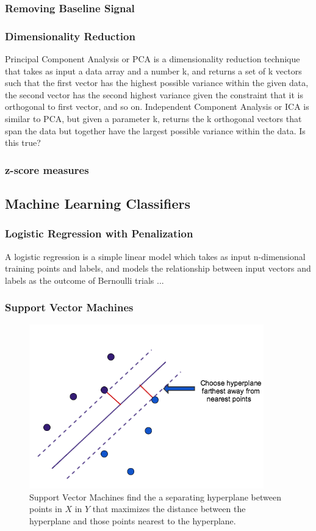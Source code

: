 \documentclass[11pt]{report}
\begin{document}
\subsubsection{Removing Baseline Signal}
\subsubsection{Dimensionality Reduction}
Principal Component Analysis or PCA is a dimensionality reduction technique that takes as input a data array and a number k, and returns a set of k vectors such that the first vector has the highest possible variance within the given data, the second vector has the second highest variance given the constraint that it is orthogonal to first vector, and so on. 
Independent Component Analysis or ICA is similar to PCA, but given a parameter k, returns the k orthogonal vectors that span the data but together have the largest possible variance within the data.  Is this true?
\subsubsection{z-score measures}

\subsection{Machine Learning Classifiers}
\subsubsection{Logistic Regression with Penalization}

A logistic regression is a simple linear model which takes as input n-dimensional training points and labels, and models the relationship between input vectors and labels as 	the outcome of Bernoulli trials ...
\subsubsection{Support Vector Machines}

\begin{figure}[t]
\centering
\includegraphics[width=4in]{svm}
\caption{Support Vector Machines find the a separating hyperplane between points in $X$ in $Y$ that maximizes the distance between the hyperplane and those points nearest to the hyperplane.}
\end{figure}
\end{document}
